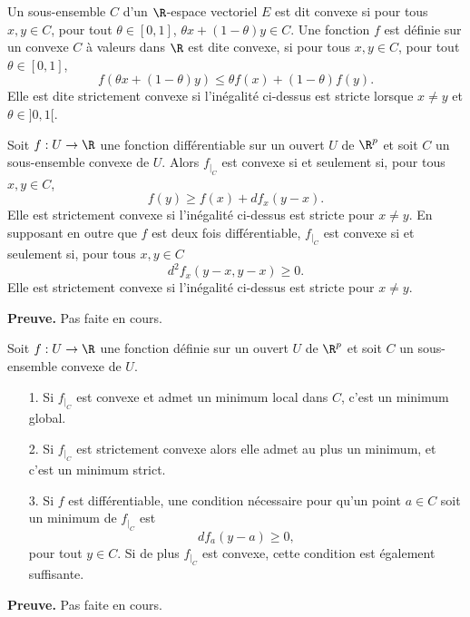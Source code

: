 \documentclass[class=report,crop=false]{standalone}
\begin{document}
\begin{definition}
\textcolor[rgb]{0.98,0.00,0.00}{
  Un sous-ensemble $C$ d'un $\R$-espace vectoriel $E$ est dit convexe si pour
tous $x,y \in C$, pour tout $\theta \in [0,1]$, $\theta x+(1- \theta)y \in C$.
Une fonction $f$ est d\'efinie sur un convexe $C$ \`a valeurs dans $\R$ est dite
convexe, si pour tous $x,y \in C$,  pour tout $\theta \in [0,1]$,
\begin{equation*}
  f(\theta x+(1-\theta)y) \leq \theta f(x)+(1-\theta)f(y).
\end{equation*}
Elle est dite strictement convexe si l'in\'egalit\'e ci-dessus est stricte lorsque $x \neq y$ et
$\theta \in ]0,1[$.}
\end{definition}

\begin{theoreme}
\textcolor[rgb]{0.44,0.00,0.87}{
  Soit $f: U \rightarrow \R$ une fonction diff\'erentiable sur un ouvert $U$ de $\R^p$ et
soit $C$ un sous-ensemble convexe de $U$. Alors $f_{\mid _C}$ est convexe si et seulement si, pour tous $x,y \in C$,
\begin{equation*}
  f(y) \geq f(x)+df_x(y-x).
\end{equation*}
Elle est strictement convexe si l'in\'egalit\'e ci-dessus est stricte pour $x \neq y$. En supposant
en outre que $f$ est deux fois diff\'erentiable, $f_{\mid _C}$ est convexe si et seulement si, pour tous $x,y \in C$
\begin{equation*}
  d^2f_x(y-x,y-x) \geq 0.
\end{equation*}
Elle est strictement convexe si l'in\'egalit\'e ci-dessus est stricte pour $x \neq y$.}
\end{theoreme}


{\textbf{Preuve.}} Pas faite en cours.


\begin{theoreme}
\textcolor[rgb]{0.44,0.00,0.87}{
  Soit $f: U \rightarrow \R$ une fonction d\'efinie sur un ouvert $U$ de $\R^p$
et soit $C$ un sous-ensemble convexe de $U$.
\begin{itemize}
  \item[1.] Si $f_{\mid _C}$ est convexe et admet un minimum local dans $C$, c'est un minimum global.
  \item[2.] Si $f_{\mid _C}$ est strictement convexe alors elle admet au plus un minimum, et c'est un minimum strict.
  \item[3.] Si $f$ est diff\'erentiable, une condition n\'ecessaire pour qu'un point $a \in C$ soit un minimum de $f_{\mid _C}$ est
\begin{equation*}
  df_a(y-a) \geq 0,
\end{equation*}
pour tout $y \in C$. Si de plus $f_{\mid _C}$ est convexe, cette condition est \'egalement suffisante.
\end{itemize}}
\end{theoreme}

{\textbf{Preuve.}} Pas faite en cours.






\finchapitre 
\end{document}
